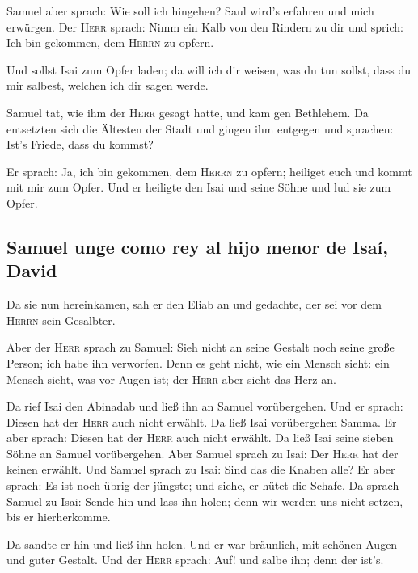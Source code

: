  Samuel aber sprach: Wie soll ich hingehen? Saul wird's
erfahren und mich erwürgen. Der \textsc{Herr} sprach: Nimm ein Kalb von
den Rindern zu dir und sprich: Ich bin gekommen, dem \textsc{Herrn} zu
opfern.

 Und sollst Isai zum Opfer laden; da will ich dir weisen,
was du tun sollst, dass du mir salbest, welchen ich dir sagen werde.

 Samuel tat, wie ihm der \textsc{Herr} gesagt hatte, und
kam gen Bethlehem. Da entsetzten sich die Ältesten der Stadt und gingen
ihm entgegen und sprachen: Ist's Friede, dass du kommst?

 Er sprach: Ja, ich bin gekommen, dem \textsc{Herrn} zu
opfern; heiliget euch und kommt mit mir zum Opfer. Und er heiligte den
Isai und seine Söhne und lud sie zum Opfer.

\hypertarget{samuel-unge-como-rey-al-hijo-menor-de-isauxed-david}{%
\subsection{Samuel unge como rey al hijo menor de Isaí,
David}\label{samuel-unge-como-rey-al-hijo-menor-de-isauxed-david}}

 Da sie nun hereinkamen, sah er den Eliab an und gedachte,
der sei vor dem \textsc{Herrn} sein Gesalbter.

 Aber der \textsc{Herr} sprach zu Samuel: Sieh nicht an
seine Gestalt noch seine große Person; ich habe ihn verworfen. Denn es
geht nicht, wie ein Mensch sieht: ein Mensch sieht, was vor Augen ist;
der \textsc{Herr} aber sieht das Herz an.

 Da rief Isai den Abinadab und ließ ihn an Samuel
vorübergehen. Und er sprach: Diesen hat der \textsc{Herr} auch nicht
erwählt.  Da ließ Isai vorübergehen Samma. Er aber sprach:
Diesen hat der \textsc{Herr} auch nicht erwählt.  Da ließ
Isai seine sieben Söhne an Samuel vorübergehen. Aber Samuel sprach zu
Isai: Der \textsc{Herr} hat der keinen erwählt.  Und
Samuel sprach zu Isai: Sind das die Knaben alle? Er aber sprach: Es ist
noch übrig der jüngste; und siehe, er hütet die Schafe. Da sprach Samuel
zu Isai: Sende hin und lass ihn holen; denn wir werden uns nicht setzen,
bis er hierherkomme.

 Da sandte er hin und ließ ihn holen. Und er war
bräunlich, mit schönen Augen und guter Gestalt. Und der \textsc{Herr}
sprach: Auf! und salbe ihn; denn der ist's.

